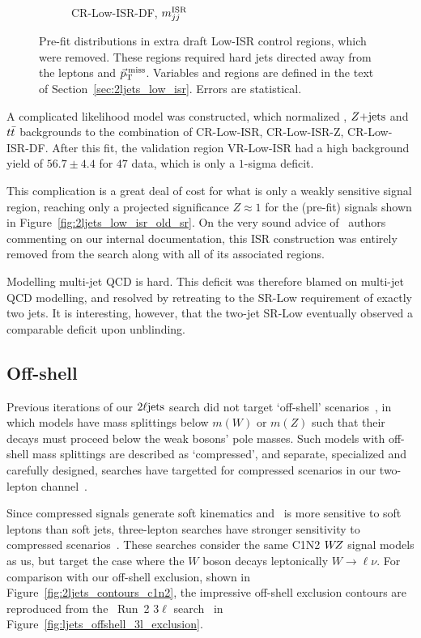 \begin{figure}[tp]
\begin{subfigure}{0.62\textwidth}
\caption{CR-Low-ISR-DF, $m_{jj}^\mathrm{ISR}$}
\end{subfigure}
\caption[
Pre-fit distributions in extra draft Low-ISR control regions, which were
removed
]{%
Pre-fit distributions in extra draft Low-ISR control regions, which were
removed.
These regions required hard jets directed away from the leptons and $\vec p_\mathrm{T}^\mathrm{\:miss}$.
Variables and regions are defined in the text of
Section~\ref{sec:2ljets_low_isr}.
Errors are statistical.
}
\label{fig:2ljets_low_isr_old_more}
\end{figure}

A complicated likelihood model was constructed, which normalized \diboson,
$Z\mathrm{+jets}$ and $t\bar t$ backgrounds to the combination of CR-Low-ISR,
CR-Low-ISR-Z, CR-Low-ISR-DF.
After this fit, the validation region VR-Low-ISR had a high background yield
of $56.7 \pm 4.4$ for $47$ data, which is only a $1$-sigma deficit.

This complication is a great deal of cost for what is only a weakly sensitive
signal region, reaching only a projected significance $Z\approx 1$ for the
(pre-fit) signals shown in Figure~\ref{fig:2ljets_low_isr_old_sr}.
On the very sound advice of \atlas\ authors commenting on our internal
documentation, this ISR construction was entirely removed from the search
along with all of its associated regions.

Modelling multi-jet QCD is hard.
This deficit was therefore blamed on multi-jet QCD modelling, and resolved by
retreating to the SR-Low requirement of exactly two jets.
It is interesting, however, that the two-jet SR-Low eventually observed a
comparable deficit upon unblinding.


\subsection{Off-shell}
\label{sec:2ljets_offshell}
Previous iterations of our $2\ell\mathrm{jets}$ search did not target `off-shell'
scenarios~\cite{atlas_23l_SUSY_2016_24, atlas_2l_SUSY_2013_11}, in which
models have mass splittings below $m(W)$ or $m(Z)$ such that their decays must
proceed below the weak bosons' pole masses.
Such models with off-shell mass splittings are described as
`compressed', and separate, specialized and carefully designed, searches
have targetted for compressed scenarios in our two-lepton channel~\cite{
atlas_susy_compressed_2l_2016_partial_run2,
atlas_susy_compressed_2l_2018_run2
}.

Since compressed signals generate soft kinematics and \atlas\ is more sensitive
to soft leptons than soft jets, three-lepton searches have stronger sensitivity
to compressed scenarios~\cite{atlas_rjr_3l_SUSY_2019_09}.
These searches consider the same C1N2 $W\kern-0.4exZ$ signal models as us, but target the
case where the $W$ boson decays leptonically $W\to\ell\nu$.
For comparison with our off-shell exclusion,
shown in Figure~\ref{fig:2ljets_contours_c1n2},
the impressive off-shell exclusion contours are reproduced
from the \atlas\ Run~2 $3\ell$ search~\cite{atlas_rjr_3l_SUSY_2019_09} in
Figure~\ref{fig:ljets_offshell_3l_exclusion}.

